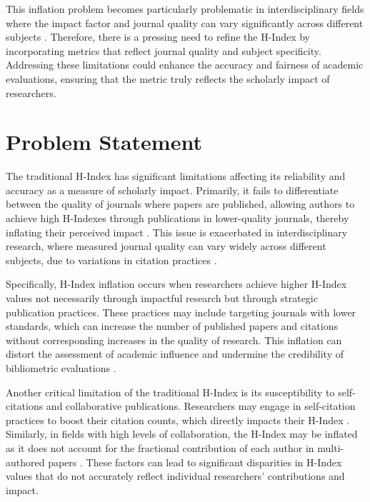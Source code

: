 This inflation problem becomes particularly problematic in interdisciplinary fields where the impact factor and journal quality
 can vary significantly across different subjects \cite{hirsch2005index,waltman2012inconsistency}. Therefore, there is a pressing need to refine the H-Index by incorporating metrics that reflect journal quality and subject specificity.
 Addressing these limitations could enhance the accuracy and fairness of academic evaluations,
 ensuring that the metric truly reflects the scholarly impact of researchers.

\section{Problem Statement}
The traditional H-Index has significant limitations affecting its reliability and accuracy as a measure of scholarly impact.
Primarily, it fails to differentiate between the quality of journals where papers are published, allowing authors
to achieve high H-Indexes through publications in lower-quality journals, thereby inflating their perceived impact \cite{costas2007h,tonta2020monetary}. 
This issue is exacerbated in interdisciplinary research, where measured journal quality can vary widely across different subjects,
due to variations in citation practices \cite{costas2007h,norris2010h}.

Specifically, H-Index inflation occurs when researchers achieve higher H-Index values not necessarily 
through impactful research but through strategic publication practices. These practices may include 
targeting journals with lower standards, which can increase the number of published papers and citations 
without corresponding increases in the quality of research. This inflation can distort the assessment of academic 
influence and undermine the credibility of bibliometric evaluations \cite{tonta2020monetary}.

Another critical limitation of the traditional H-Index is its susceptibility to self-citations and collaborative publications. 
Researchers may engage in self-citation practices to boost their citation counts, 
which directly impacts their H-Index \cite{hirsch2005index,schreiber2008share,costas2007h,waltman2012inconsistency,norris2010h,bartneck2011detecting,zhivotovsky2008self}. 
Similarly, in fields with high levels of collaboration, the H-Index may be inflated as it does not account for the fractional contribution 
of each author in multi-authored papers \cite{schreiber2008share,costas2007h,waltman2012inconsistency,norris2010h,zhivotovsky2008self}. 
These factors can lead to significant disparities in H-Index values 
that do not accurately reflect individual researchers' contributions and impact.

